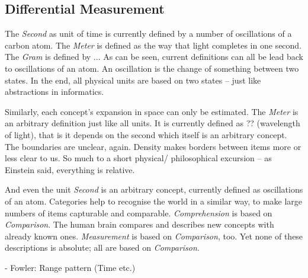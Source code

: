 %
%
%
%
%
%
%

\subsection{Differential Measurement}
\label{differential_measurement_heading}

The \emph{Second} as unit of time is currently defined by a number of oscillations
of a carbon atom. The \emph{Meter} is defined as the way that light completes in
one second. The \emph{Gram} is defined by ...
As can be seen, current definitions can all be lead back to oscillations of an
atom. An oscillation is the change of something between two states. In the end,
all physical units are based on two states -- just like abstractions in informatics.

Similarly, each concept's expansion in space can only be estimated. The
\emph{Meter} is an arbitrary definition just like all units. It is currently
defined as ?? (wavelength of light), that is it depends on the second which
itself is an arbitrary concept.
The boundaries are unclear, again.
Density makes borders between items more or less clear to us.
So much to a short physical/ philosophical excursion -- as Einstein said,
everything is relative.

And even the unit \emph{Second} is an arbitrary concept, currently defined as
oscillations of an atom.
Categories help to recognise the world in a similar way, to make large numbers
of items capturable and comparable. \emph{Comprehension} is based on
\emph{Comparison}. The human brain compares and describes new concepts with
already known ones. \emph{Measurement} is based on \emph{Comparison}, too.
Yet none of these descriptions is absolute; all are based on \emph{Comparison}.

- Fowler: Range pattern (Time etc.)

